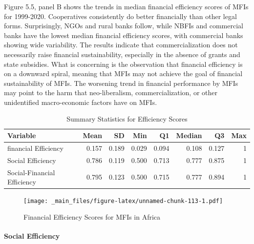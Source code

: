 \documentclass[a4paper, nobind]{templates/ociamthesis}
\begin{document}
Figure 5.5, panel B shows the trends in median financial efficiency scores of MFIs for 1999-2020. Cooperatives consistently do better financially than other legal forms. Surprisingly, NGOs and rural banks follow, while NBFIs and commercial banks have the lowest median financial efficiency scores, with commercial banks showing wide variability. The results indicate that commercialization does not necessarily raise financial sustainability, especially in the absence of grants and state subsidies. What is concerning is the observation that financial efficiency is on a downward spiral, meaning that MFIs may not achieve the goal of financial sustainability of MFIs. The worsening trend in financial performance by MFIs may point to the harm that neo-liberalism, commercialization, or other unidentified macro-economic factors have on MFIs.

\begin{table}

\caption{\label{tab:unnamed-chunk-112}Summary Statistics for Efficiency Scores}
\centering
\fontsize{9}{11}\selectfont
\begin{tabular}[t]{lrrrrrrr}
\toprule
Variable & Mean & SD & Min & Q1 & Median & Q3 & Max\\
\midrule
financial Efficiency & 0.157 & 0.189 & 0.029 & 0.094 & 0.108 & 0.127 & 1\\
Social Efficiency & 0.786 & 0.119 & 0.500 & 0.713 & 0.777 & 0.875 & 1\\
Social-Financial Efficiency & 0.795 & 0.123 & 0.500 & 0.715 & 0.777 & 0.894 & 1\\
\bottomrule
\end{tabular}
\end{table}

\begin{landscape}

\newpage

\begin{figure}
\centering
\texttt{[image: \_main\_files/figure-latex/unnamed-chunk-113-1.pdf]}
\caption{\label{fig:unnamed-chunk-113}Financial Efficiency Scores for MFIs in Africa}
\end{figure}

\end{landscape}

\newpage

\hypertarget{social-efficiency}{%
\paragraph{Social Efficiency}\label{social-efficiency}}
\end{document}

